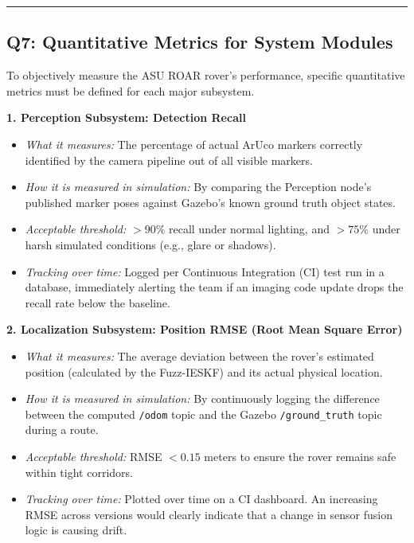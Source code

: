 \documentclass[12pt,a4paper]{article}
\begin{document}
\vspace{0.3em}
\noindent\rule{\textwidth}{0.4pt}
\vspace{0.3em}


\subsection{Q7: Quantitative Metrics for System Modules}

To objectively measure the ASU ROAR rover's performance, specific quantitative metrics must be defined for each major subsystem.

\noindent\textbf{1. Perception Subsystem: Detection Recall}
\begin{itemize}[leftmargin=*]
    \item \textit{What it measures:} The percentage of actual ArUco markers correctly identified by the camera pipeline out of all visible markers.
    \item \textit{How it is measured in simulation:} By comparing the Perception node's published marker poses against Gazebo's known ground truth object states.
    \item \textit{Acceptable threshold:} $>90\%$ recall under normal lighting, and $>75\%$ under harsh simulated conditions (e.g., glare or shadows).
    \item \textit{Tracking over time:} Logged per Continuous Integration (CI) test run in a database, immediately alerting the team if an imaging code update drops the recall rate below the baseline.
\end{itemize}

\noindent\textbf{2. Localization Subsystem: Position RMSE (Root Mean Square Error)}
\begin{itemize}[leftmargin=*]
    \item \textit{What it measures:} The average deviation between the rover's estimated position (calculated by the Fuzz-IESKF) and its actual physical location.
    \item \textit{How it is measured in simulation:} By continuously logging the difference between the computed \texttt{/odom} topic and the Gazebo \texttt{/ground\_truth} topic during a route.
    \item \textit{Acceptable threshold:} RMSE $< 0.15$ meters to ensure the rover remains safe within tight corridors.
    \item \textit{Tracking over time:} Plotted over time on a CI dashboard. An increasing RMSE across versions would clearly indicate that a change in sensor fusion logic is causing drift.
\end{itemize}
\end{document}
